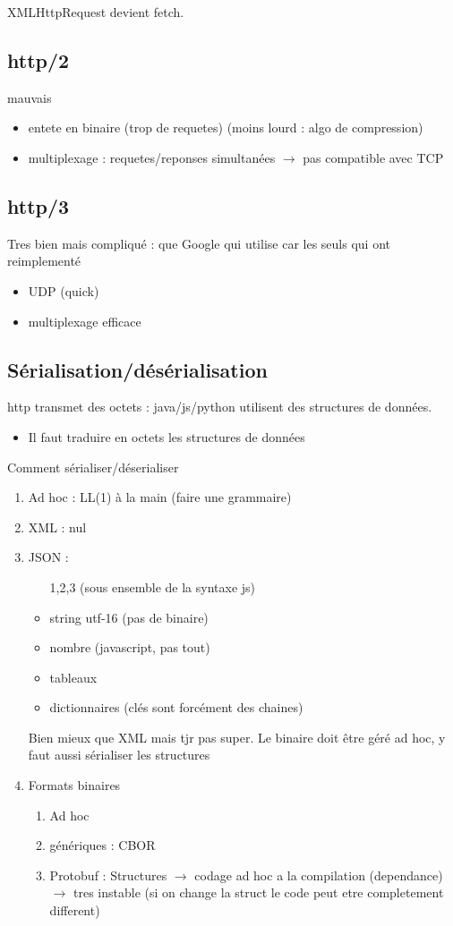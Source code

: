 \documentclass[12pt]{article}
\theoremstyle{plain}
\theoremstyle{definition}
\theoremstyle{remark}
\begin{document}
XMLHttpRequest devient fetch.

\subsection{http/2}
mauvais
\begin{itemize}
    \item entete en binaire (trop de requetes) (moins lourd : algo de compression)
    \item multiplexage : requetes/reponses simultanées $\rightarrow$ pas compatible avec TCP
\end{itemize}

\subsection{http/3}
Tres bien mais compliqué : que Google qui utilise car les seuls qui ont reimplementé
\begin{itemize}
    \item UDP (quick)
    \item multiplexage efficace
\end{itemize}

\subsection{Sérialisation/désérialisation}
http transmet des octets : java/js/python utilisent des structures de données. 
\begin{itemize}
    \item Il faut traduire en octets les structures de données
\end{itemize}

Comment sérialiser/déserialiser
\begin{enumerate}
    \item Ad hoc : LL(1) à la main (faire une grammaire)
    \item XML : nul 
    \item JSON : \begin{itemize}
        \item [1,2,3] (sous ensemble de la syntaxe js)
        \item string utf-16 (pas de binaire)
        \item nombre (javascript, pas tout)
        \item tableaux
        \item dictionnaires (clés sont forcément des chaines)
    \end{itemize} Bien mieux que XML mais tjr pas super. Le binaire doit être géré ad hoc, y faut aussi sérialiser les structures
    \item Formats binaires \begin{enumerate}
        \item Ad hoc
        \item génériques : CBOR
        \item Protobuf : Structures $\rightarrow$ codage ad hoc a la compilation (dependance) $\rightarrow$ tres instable (si on change la struct le code peut etre completement different)
    \end{enumerate}
\end{enumerate}
\end{document}
